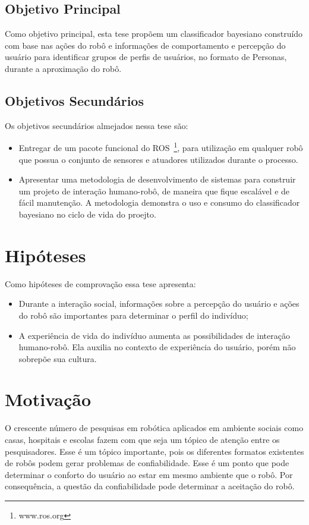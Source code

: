 \subsection{Objetivo Principal}
Como objetivo principal, esta tese propõem um classificador bayesiano construído com base nas ações do robô e informações de comportamento e percepção do usuário para identificar grupos de perfis de usuários, no formato de Personas, durante a aproximação do robô.

\subsection{Objetivos Secundários}
Os objetivos secundários almejados nessa tese são:

\begin{itemize}
    \item Entregar de um pacote funcional do ROS~\footnote{www.ros.org}, para utilização em qualquer robô que possua o conjunto de sensores e atuadores utilizados durante o processo.
    \item Apresentar uma metodologia de desenvolvimento de sistemas para construir um projeto de interação humano-robô, de maneira que fique escalável e de fácil manutenção. A metodologia demonstra o uso e consumo do classificador bayesiano no ciclo de vida do proejto.
\end{itemize}

\section{Hipóteses}
Como hipóteses de comprovação essa tese apresenta:

\begin{itemize}
    \item Durante a interação social, informações sobre a percepção do usuário e ações do robô são importantes para determinar o perfil do indivíduo;
    \item A experiência de vida do indivíduo aumenta as possibilidades de interação humano-robô. Ela auxilia no contexto de experiência do usuário, porém não sobrepõe sua cultura.
\end{itemize}

\section{Motivação}
O crescente número de pesquisas em robótica aplicados em ambiente sociais como casas, hospitais e escolas fazem com que seja um tópico de atenção entre os pesquisadores. Esse é um tópico importante, pois os diferentes formatos existentes de robôs podem gerar problemas de confiabilidade. Esse é um ponto que pode determinar o conforto do usuário ao estar em mesmo ambiente que o robô. Por consequência, a questão da confiabilidade pode determinar a aceitação do robô.

